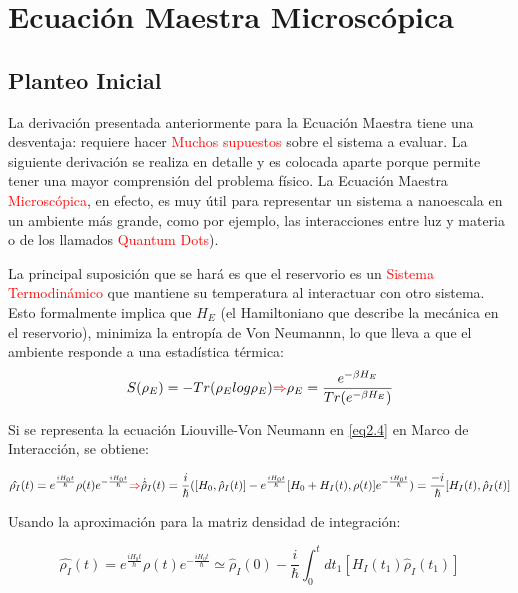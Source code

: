 \documentclass{book}
\begin{document}
\chapter{Ecuación Maestra Microscópica}
\section{Planteo Inicial}
La derivación presentada anteriormente para la Ecuación Maestra tiene una desventaja: requiere hacer \textcolor{red}{Muchos supuestos} sobre el sistema a evaluar. La siguiente derivación se realiza en detalle y es colocada aparte porque permite tener una mayor comprensión del problema físico. La Ecuación Maestra \textcolor{red}{Microscópica}, en efecto, es muy útil para representar un sistema a nanoescala en un ambiente más grande, como por ejemplo, las interacciones entre luz y materia o de los llamados \textcolor{red}{Quantum Dots}).

La principal suposición que se hará es que el reservorio es un \textcolor{red}{Sistema Termodinámico} que mantiene su temperatura al interactuar con otro sistema. Esto formalmente implica que $H_E$ (el Hamiltoniano que describe la mecánica en el reservorio), minimiza la entropía de Von Neumannn, lo que lleva a que el ambiente responde a una estadística térmica:
\begin{equation}\label{eq3.1} S(\rho_E)=-Tr(\rho_E log \rho_E) \textcolor{red}{\Rightarrow}  \rho_E=\frac{e^{-\beta H_E}}{Tr(e^{-\beta H_E})} \end{equation}

Si se representa la ecuación Liouville-Von Neumann en \ref{eq2.4} en Marco de Interacción, se obtiene:

\begin{equation}\label{eq3.2}\hat{\rho_I}(t)=e^{\frac{iH_0t}{\hslash}}\rho(t)e^{-\frac{iH_0t}{\hslash}}\textcolor{red}{\Rightarrow}\dot{\hat{\rho}}_I(t)=\frac{i}{\hslash}([H_0,\hat{\rho}_I(t)]-e^{\frac{iH_0t}{\hslash}}[H_0+H_I(t),\rho(t)]e^{-\frac{iH_0t}{\hslash}})=\frac{-i}{\hslash}[H_I(t),\hat{\rho}_I(t)]\end{equation}

Usando la aproximación para la matriz densidad de integración:

\begin{equation}\label{eq3.3}\hat{\rho_I}(t)=e^{\frac{iH_0t}{\hslash}}\rho(t)e^{-\frac{iH_0t}{\hslash}}\simeq \hat{\rho}_I(0)- \frac{i}{\hbar}\int_0^t dt_1[H_I(t_1)\hat{\rho}_I(t_1)]\end{equation}
\end{document}
